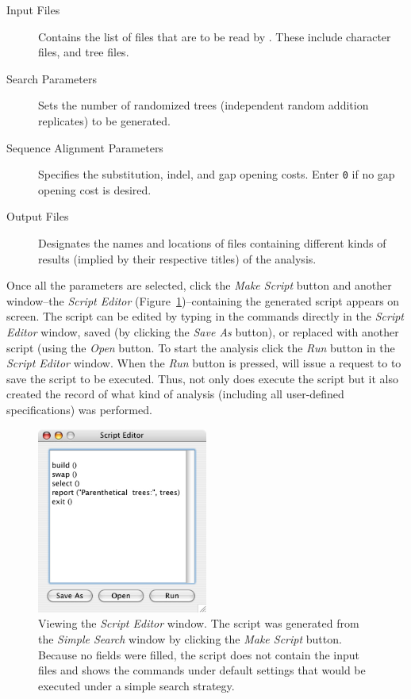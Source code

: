 \begin{description}
    \item[Input Files]
        Contains the list of files that are to be read by \poy. These include
        character files, and tree files. 
    \item[Search Parameters]
        Sets the number of randomized trees (independent random addition replicates)
        to be generated.
    \item[Sequence Alignment Parameters]
        Specifies the substitution, indel, and gap opening costs. Enter \texttt{0} if no
        gap opening cost is desired.
    \item[Output Files]
        Designates the names and locations of files containing different kinds of results
        (implied by their respective titles) of the analysis.
\end{description}

Once all the parameters are selected, click the \emph{Make Script} button and another
window--the \emph{Script Editor} (Figure~\ref{fig:ScriptEditor_Window})--containing the generated script appears on screen. The
script can be edited by typing in the commands directly in the \emph{Script Editor} window,
 saved (by clicking the \emph{Save As} button), or replaced with another script (using 
 the \emph{Open} button. To start the analysis click the \emph{Run} button in the 
 \emph{Script Editor} window. When the \emph{Run} button is pressed, \poy will issue a
 request to  to save the script to be executed. Thus, not only does \poy execute the script but
 it also created the record of what kind of analysis (including all user-defined specifications) was performed.
 
 \begin{figure}[htpb]
    \begin{center}
        \includegraphics[width=0.5\textwidth]{figures/ScriptEditor_Window.jpg}
    \end{center}
    \caption{Viewing the \emph{Script Editor} window. The script was generated from the \emph{Simple Search} window by clicking the \emph{Make Script} button. Because no fields were filled, the script does not contain the input files and shows the commands under default settings that would be executed under a simple search strategy.}
    \label{fig:ScriptEditor_Window}
\end{figure}


